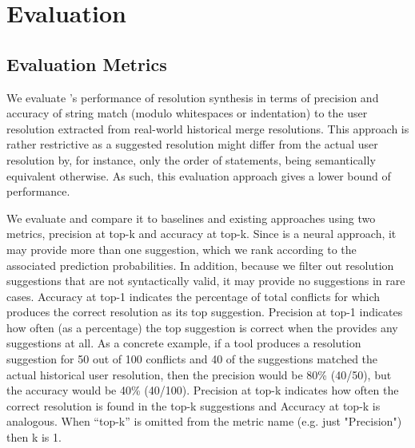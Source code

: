 \section{Evaluation}

\subsection{Evaluation Metrics}

We evaluate \thistool{}'s performance of resolution synthesis in terms of precision and accuracy of string match (modulo whitespaces or indentation) to the user resolution extracted from real-world historical merge resolutions. This approach is rather restrictive as a suggested resolution might differ from the actual user resolution by, for instance, only the order of statements, being semantically equivalent otherwise. As such, this evaluation approach gives a lower bound of performance.

We evaluate \thistool{} and compare it to baselines and existing approaches using two metrics, precision at top-k and accuracy at top-k.  
Since \thistool{} is a neural approach, it may provide more than one suggestion, which we rank according to the associated prediction probabilities.
In addition, because we filter out resolution suggestions that are not syntactically valid, it may provide no suggestions in rare cases.  
Accuracy at top-1 indicates the percentage of total conflicts for which \thistool{} produces the correct resolution as its top suggestion. Precision at top-1 indicates how often (as a percentage) the top suggestion is correct when the \thistool{} provides any suggestions at all.  As a concrete example, if a tool produces a resolution suggestion for 50 out of 100 conflicts and 40 of the suggestions matched the actual historical user resolution, then the precision would be 80\% (40/50), but the accuracy would be 40\% (40/100).  Precision at top-k indicates how often the correct resolution is found in the top-k suggestions and Accuracy at top-k is analogous. When ``top-k'' is omitted from the metric name (e.g. just "Precision") then k is 1.



